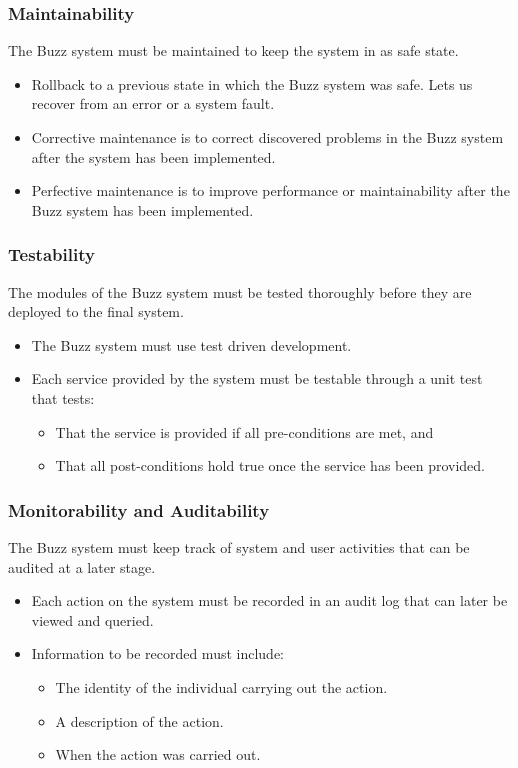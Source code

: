 \documentclass[12pt, oneside]{article}
\begin{document}
	\subsubsection*{Maintainability}
	The Buzz system must be maintained to keep the system in as safe state.
	\begin{itemize}
		\item Rollback to a previous state in which the Buzz system was safe. Lets us recover from an error or a system fault.
		\item Corrective maintenance is to correct discovered problems in the Buzz system after the system has been implemented.
		\item Perfective maintenance is to improve performance or maintainability after the Buzz system has been implemented.
	\end{itemize}
	
	\subsubsection*{Testability}
	The modules of the Buzz system must be tested thoroughly before they are deployed to the final system.
	\begin{itemize}
		\item The Buzz system must use test driven development.
		\item Each service provided by the system must be testable through a unit test that tests:
		\begin{itemize}
			\item That the service is provided if all pre-conditions are met, and
			\item That all post-conditions hold true once the service has been provided.
		\end{itemize}
	\end{itemize}
	
	\subsubsection*{Monitorability and Auditability}
	The Buzz system must keep track of system and user activities that can be audited at a later stage.
	\begin{itemize}
		\item Each action on the system must be recorded in an audit log that can later be viewed and queried.
		\item Information to be recorded must include:
		\begin{itemize}
			\item The identity of the individual carrying out the action.
			\item A description of the action.
			\item When the action was carried out.
		\end{itemize}						
	\end{itemize}
\end{document}
